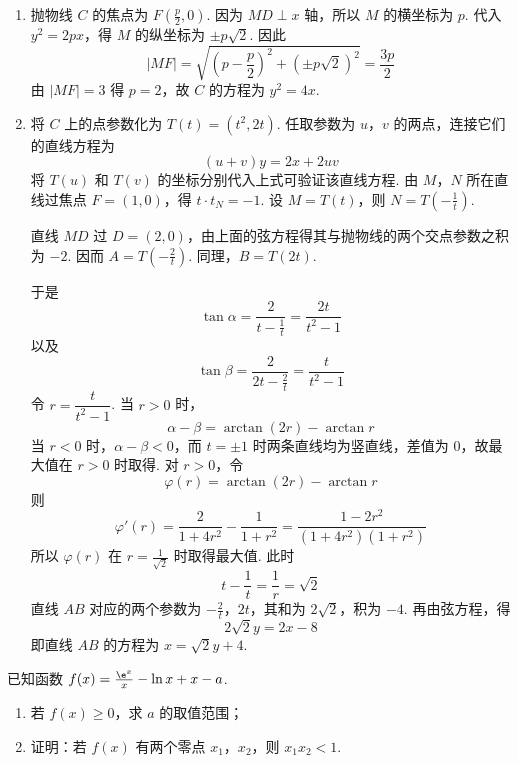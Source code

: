 \begin{solution}
\begin{enumerate}
\item 抛物线 \(C\) 的焦点为 \(F\left(\frac p2,0\right)\). 因为 \(MD\perp x\) 轴，所以 \(M\) 的横坐标为 \(p\). 代入 \(y^2=2px\)，得 \(M\) 的纵坐标为 \(\pm p\sqrt2\). 因此
\[
|MF|=\sqrt{\left(p-\frac p2\right)^2+(\pm p\sqrt2)^2}=\frac{3p}{2}
\]
由 \(|MF|=3\) 得 \(p=2\)，故 \(C\) 的方程为 \(y^2=4x\).
\item 将 \(C\) 上的点参数化为 \(T(t)=(t^2,2t)\). 任取参数为 \(u\)，\(v\) 的两点，连接它们的直线方程为
\[
(u+v)y=2x+2uv
\]
将 \(T(u)\) 和 \(T(v)\) 的坐标分别代入上式可验证该直线方程.
由 \(M\)，\(N\) 所在直线过焦点 \(F=(1,0)\)，得 \(t\cdot t_N=-1\). 设 \(M=T(t)\)，则 \(N=T\left(-\frac1t\right)\).

直线 \(MD\) 过 \(D=(2,0)\)，由上面的弦方程得其与抛物线的两个交点参数之积为 \(-2\). 因而 \(A=T\left(-\frac2t\right)\). 同理，\(B=T(2t)\).

于是
\[
\tan\alpha=\frac{2}{t-\frac1t}=\frac{2t}{t^2-1}
\]
以及
\[
\tan\beta=\frac{2}{2t-\frac2t}=\frac{t}{t^2-1}
\]
令 \(r=\dfrac{t}{t^2-1}\). 当 \(r>0\) 时，
\[
\alpha-\beta=\arctan(2r)-\arctan r
\]
当 \(r<0\) 时，\(\alpha-\beta<0\)，而 \(t=\pm1\) 时两条直线均为竖直线，差值为 \(0\)，故最大值在 \(r>0\) 时取得. 对 \(r>0\)，令
\[
\varphi(r)=\arctan(2r)-\arctan r
\]
则
\[
\varphi'(r)=\frac2{1+4r^2}-\frac1{1+r^2}=\frac{1-2r^2}{(1+4r^2)(1+r^2)}
\]
所以 \(\varphi(r)\) 在 \(r=\frac1{\sqrt2}\) 时取得最大值. 此时
\[
t-\frac1t=\frac1r=\sqrt2
\]
直线 \(AB\) 对应的两个参数为 \(-\frac2t\)，\(2t\)，其和为 \(2\sqrt2\)，积为 \(-4\). 再由弦方程，得
\[
2\sqrt2y=2x-8
\]
即直线 \(AB\) 的方程为 \(x=\sqrt2y+4\).
\end{enumerate}
\end{solution}

\begin{problem}
已知函数 \(f(x)=\frac{\e^x}{x}-\ln x+x-a\).

\begin{enumerate}
\item 若 \(f(x)\ge 0\)，求 \(a\) 的取值范围；
\item 证明：若 \(f(x)\) 有两个零点 \(x_1\)，\(x_2\)，则 \(x_1x_2<1\).
\end{enumerate}
\end{problem}

